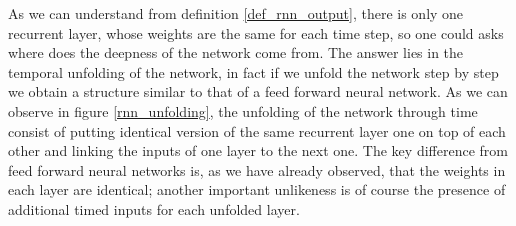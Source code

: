 As we can understand from definition \ref{def_rnn_output}, there is only one recurrent layer, whose weights are the same for each time step, so one could asks where does the deepness of the network come from.
The answer lies in the temporal unfolding of the network, in fact if we unfold the network step by step we obtain a structure similar to that of a feed forward neural network. As we can observe
in figure \ref{rnn_unfolding}, the unfolding of the network through time consist of putting identical version of the same recurrent layer one on top of each other and linking the inputs of one layer to the
next one. The key difference from feed forward neural networks is, as we have already observed, that the weights in each layer are identical; another
important unlikeness is of course the presence of additional timed inputs for each unfolded layer.

